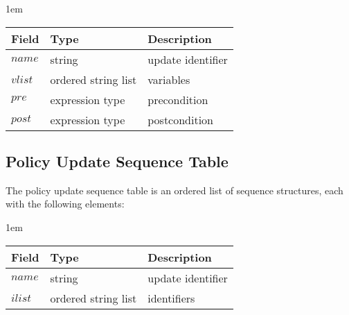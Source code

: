 \documentclass[global,twocolumn,final]{svjour}
\newenvironment{vquote}
  {\begin{list}{}{\leftmargin 1em}\item[]}
  {\end{list}}
\begin{document}
        \begin{vquote}
          \begin{tabular}[t]{|l|l|l|}
            \hline
            \textbf{Field} & \textbf{Type} & \textbf{Description} \\
            \hline
            $name$ & string & update identifier \\
            \hline
            $vlist$ & ordered string list & variables \\
            \hline
            $pre$ & expression type & precondition \\
            \hline
            $post$ & expression type & postcondition \\
            \hline
          \end{tabular}
        \end{vquote}

    \subsection{Policy Update Sequence Table}

      The policy update sequence table is an ordered list of sequence
      structures, each with the following elements:

      \begin{vquote}
        \begin{tabular}[t]{|l|l|l|}
          \hline
          \textbf{Field} & \textbf{Type} & \textbf{Description} \\
          \hline
          $name$ & string & update identifier \\
          \hline
          $ilist$ & ordered string list & identifiers \\
          \hline
        \end{tabular}
      \end{vquote}
\end{document}
